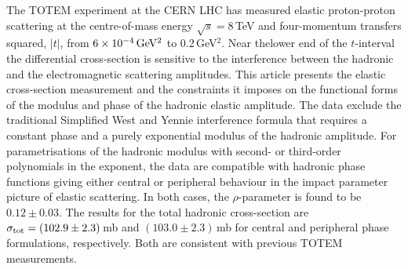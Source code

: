 The TOTEM experiment at the CERN LHC has measured elastic proton-proton 
scattering at the centre-of-mass energy 
$\sqrt{s}=8\,$TeV and four-momentum transfers\Break
squared, $|t|$, from $6\times10^{-4}\,\rm GeV^{2}$ to 0.2\,GeV$^{2}$.
Near the\Break lower end of the $t$-interval the differential cross-section is 
sensitive to the 
interference between the hadronic and the electromagnetic scattering amplitudes.
This article presents the elastic cross-section measurement and the constraints it 
imposes on the functional forms of the modulus and
phase of the hadronic elastic amplitude. The data exclude the traditional 
Simplified West and Yennie interference formula that requires a constant 
phase and a purely exponential modulus of the hadronic amplitude. 
For parametrisations of the hadronic modulus with second- or third-order 
polynomials in the exponent, the data are compatible with hadronic phase 
functions giving either central or peripheral behaviour in the impact 
parameter picture of elastic scattering. In both cases, 
the $\rho$-parameter is found to be $0.12 \pm 0.03$. 
The results for the total hadronic 
cross-section are $\sigma_{\rm tot} = (102.9 \pm 2.3)$\,mb and 
$(103.0 \pm 2.3)$\,mb for central and peripheral phase formulations, 
respectively. Both are consistent with previous TOTEM measurements.
